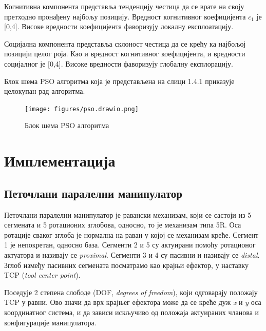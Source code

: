 \documentclass[12pt]{article}
\begin{document}
Когнитивна компонента представља тенденцију честица да се врате на своју претходно пронађену најбољу позицију. Вредност когнитивног коефицијента $c_1$ је [0,4]. Високе вредности коефицијента фаворизују локалну експлоатацију.

Социјална компонента представља склоност честица да се крећу ка најбољој позицији целог роја. Као и вредност когнитивног коефицијента, и вредности социјалног је [0,4]. Високе вредности фаворизују глобалну експлорацију.

Блок шема PSO алгоритма која је представљена на слици 1.4.1 приказује целокупан рад алгоритма.

\begin{figure}[H]
    \centering
    \texttt{[image: figures/pso.drawio.png]}
    \caption{Блок шема PSO алгоритма}
    \label{fig:PSO_алгоритам}
\end{figure}
\newpage

\section{Имплементација}

\subsection{Петочлани паралелни манипулатор}
Петочлани паралелни манипулатор је равански механизам, који се састоји из 5 сегмената и 5 ротационих зглобова, односно, то је механизам типа 5R. Оса ротације сваког зглоба је нормална на раван у којој се механизам креће. Сегмент 1 је непокретан, односно база. Сегменти 2 и 5 су актуирани помоћу ротационог актуатора и називају се \textit{proximal}. Сегменти 3 и 4 су пасивни и називају се \textit{distal}. Зглоб између пасивних сегмената посматрамо као крајњи ефектор, у наставку TCP (\textit{tool center point}).

 Поседује 2 степена слободе (DOF, \textit{degrees of freedom}), који одговарају положају TCP у равни. Ово значи да врх крајњег ефектора може да се креће дуж \textit{x} и \textit{y} оса координатног система, и да зависи искључиво од положаја актуираних чланова и конфигурације манипулатора.
\end{document}
